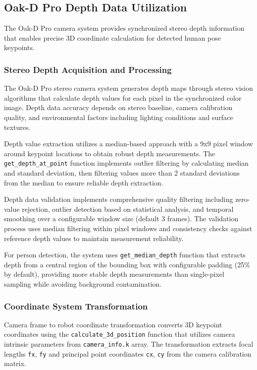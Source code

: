 \subsection{Oak-D Pro Depth Data Utilization}

The Oak-D Pro camera system provides synchronized stereo depth information that enables precise 3D coordinate calculation for detected human pose keypoints.

\subsubsection{Stereo Depth Acquisition and Processing}

The Oak-D Pro stereo camera system generates depth maps through stereo vision algorithms that calculate depth values for each pixel in the synchronized color image. Depth data accuracy depends on stereo baseline, camera calibration quality, and environmental factors including lighting conditions and surface textures.

Depth value extraction utilizes a median-based approach with a 9x9 pixel window around keypoint locations to obtain robust depth measurements. The \texttt{get\_depth\_at\_point} function implements outlier filtering by calculating median and standard deviation, then filtering values more than 2 standard deviations from the median to ensure reliable depth extraction.

Depth data validation implements comprehensive quality filtering including zero-value rejection, outlier detection based on statistical analysis, and temporal smoothing over a configurable window size (default 3 frames). The validation process uses median filtering within pixel windows and consistency checks against reference depth values to maintain measurement reliability.

For person detection, the system uses \texttt{get\_median\_depth} function that extracts depth from a central region of the bounding box with configurable padding (25\% by default), providing more stable depth measurements than single-pixel sampling while avoiding background contamination.

\subsubsection{Coordinate System Transformation}

Camera frame to robot coordinate transformation converts 3D keypoint coordinates using the \texttt{calculate\_3d\_position} function that utilizes camera intrinsic parameters from \texttt{camera\_info.k} array. The transformation extracts focal lengths \texttt{fx}, \texttt{fy} and principal point coordinates \texttt{cx}, \texttt{cy} from the camera calibration matrix.

